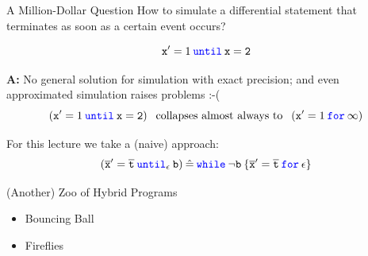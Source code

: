 \documentclass{beamer}
\newcommand{\blue}[1]{\textcolor{blue}{#1}}
\begin{document}
\begin{frame}{A Million-Dollar Question}
        How to simulate a differential statement that \alert{terminates
        as soon as} a certain \alert{event} occurs?  

        \[
                \mathtt{x}' = 1 \> \mathtt{\blue{until}} \> \mathtt{x = 2}
        \]

        \textbf{A:} No general solution for simulation with \alert{exact
        precision}; and even approximated simulation raises problems :-( 
        \[
                (\mathtt{x}' = 1 \> \mathtt{\blue{until}} \> \mathtt{x = 2}) \> \>
                \text{ collapses almost always to } \> \>
                (\mathtt{x}' = 1 \> \mathtt{\blue{for}} \> \mathtt{\infty})
        \]

        \vfill
        \pause
        For this lecture we take a (naive) approach:
        \[
                (\overline{\mathtt{x}}' = \overline{\mathtt{t}} \>
                \blue{\mathtt{until}}_\epsilon \> \mathtt{b}) \> \hat = \>
                \blue{\mathtt{while}} \> \neg \mathtt{b} \> \{ \overline{\mathtt{x}}' 
                = \overline{\mathtt{t}} \> \blue{\mathtt{for}} \> \epsilon \} 
        \]
        \end{frame}
\begin{frame}{(Another) Zoo of Hybrid Programs}
        \begin{itemize}
                \item Bouncing Ball
                \item Fireflies
        \end{itemize}

\end{frame}
\end{document}
